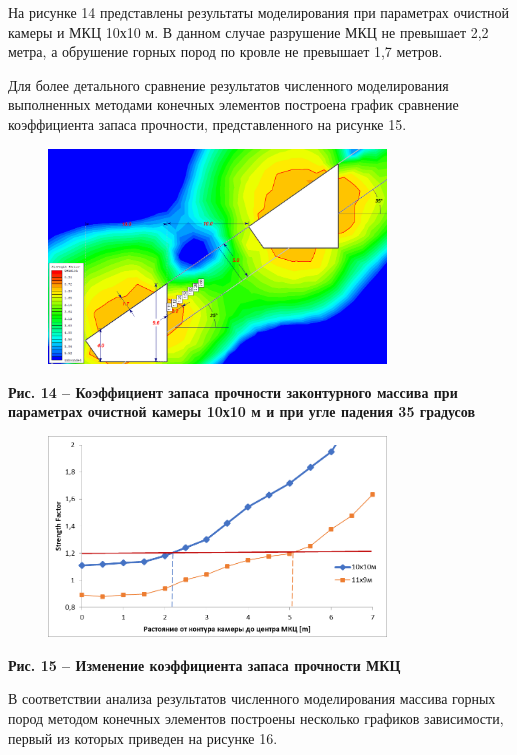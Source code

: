 На рисунке 14 представлены результаты моделирования при параметрах
очистной камеры и МКЦ 10х10 м. В данном случае разрушение МКЦ не
превышает 2,2 метра, а обрушение горных пород по кровле не превышает 1,7
метров.

Для более детального сравнение результатов численного моделирования
выполненных методами конечных элементов построена график сравнение
коэффициента запаса прочности, представленного на рисунке 15.

\begin{figure}[H]
	\centering
	\includegraphics[width=0.8\textwidth]{assets/294}
	\caption*{}
\end{figure}

{\bfseries Рис. 14 -- Коэффициент запаса прочности законтурного массива при
параметрах очистной камеры 10х10 м и при угле падения 35 градусов}

\begin{figure}[H]
	\centering
	\includegraphics[width=0.8\textwidth]{assets/295}
	\caption*{}
\end{figure}

{\bfseries Рис. 15 -- Изменение коэффициента запаса прочности МКЦ}

В соответствии анализа результатов численного моделирования массива
горных пород методом конечных элементов построены несколько графиков
зависимости, первый из которых приведен на рисунке 16.

